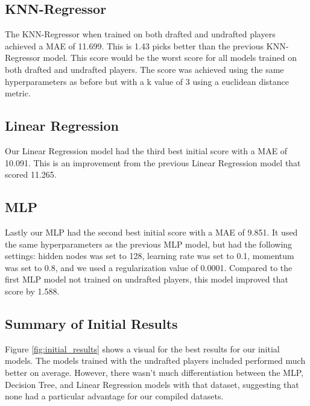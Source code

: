 \documentclass{article}
\begin{document}
\subsection{KNN-Regressor}

The KNN-Regressor when trained on both drafted and undrafted players achieved a
MAE of 11.699. This is 1.43 picks better than the previous KNN-Regressor model.
This score would be the worst score for all models trained on both drafted and
undrafted players. The score was achieved using the same hyperparameters as
before but with a k value of 3 using a euclidean distance metric.

\subsection{Linear Regression}

Our Linear Regression model had the third best initial score with a MAE of
10.091. This is an improvement from the previous Linear Regression model that
scored 11.265.

\subsection{MLP}

Lastly our MLP had the second best initial score with a MAE of 9.851. It used
the same hyperparameters as the previous MLP model, but had the following
settings: hidden nodes was set to 128, learning rate was set to 0.1, momentum
was set to 0.8, and we used a regularization value of 0.0001. Compared to the
first MLP model not trained on undrafted players, this model improved that score
by 1.588.

\subsection{Summary of Initial Results}

Figure \ref{fig:initial_results} shows a visual for the best results for our
initial models. The models trained with the undrafted players included performed
much better on average. However, there wasn't much differentiation between the
MLP, Decision Tree, and Linear Regression models with that dataset, suggesting
that none had a particular advantage for our compiled datasets.
\end{document}
